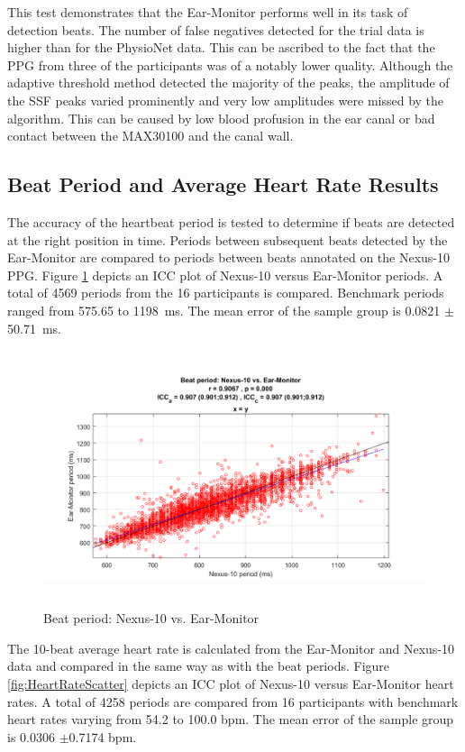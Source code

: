 This test demonstrates that the Ear-Monitor performs well in its task of detection beats. The number of false negatives detected for the trial data is higher than for the PhysioNet data. This can be ascribed to the fact that the PPG from three of the participants was of a notably lower quality. Although the adaptive threshold method detected the majority of the peaks, the amplitude of the SSF peaks varied prominently and very low amplitudes were missed by the algorithm. This can be caused by low blood profusion in the ear canal or bad contact between the MAX30100 and the canal wall.

\subsection{Beat Period and Average Heart Rate Results}
The accuracy of the heartbeat period is tested to determine if beats are detected at the right position in time. Periods between subsequent  beats detected by the Ear-Monitor are compared to periods between beats annotated on the Nexus-10 PPG. Figure \ref{fig:PeriodScatter} depicts an ICC plot of Nexus-10 versus Ear-Monitor periods. A total of 4569 periods from the 16 participants is compared. Benchmark periods ranged from 575.65 to \SI{1198}{\milli\second}. The mean error of the sample group is 0.0821 $\pm$\SI{50.71}{\milli\second}.

\begin{figure}[H]
   \centering
   \includegraphics[width=12cm,height=7.5cm]{figs/PeriodScatter.png}
   \caption{Beat period: Nexus-10 vs. Ear-Monitor}
   \label{fig:PeriodScatter}
\end{figure}

The 10-beat average heart rate is calculated from the Ear-Monitor and Nexus-10 data and compared in the same way as with the beat periods. Figure \ref{fig:HeartRateScatter} depicts an ICC plot of Nexus-10 versus Ear-Monitor heart rates. A total of 4258 periods are compared from 16 participants with benchmark heart rates varying from 54.2 to 100.0 bpm. The mean error of the sample group is 0.0306 $\pm$0.7174 bpm.

